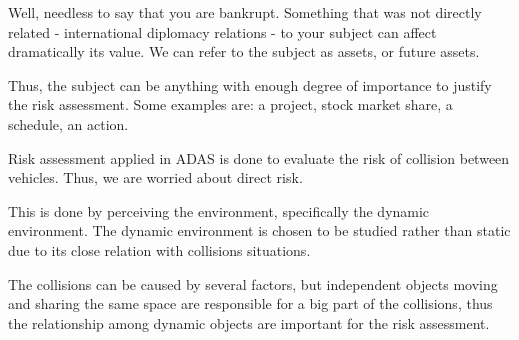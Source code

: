 Well, needless to say that you are bankrupt. Something that was not directly related - international diplomacy relations - to your subject can affect dramatically its value. We can refer to the subject as assets, or future assets.

Thus, the subject can be anything with enough degree of importance to justify the risk assessment. Some examples are: a project, stock market share, a schedule, an action.

Risk assessment applied in ADAS is done to evaluate the risk of collision between vehicles. Thus, we are worried about direct risk. 

This is done by perceiving the environment, specifically the dynamic environment. The dynamic environment is chosen to be studied rather than static due to its close relation with  collisions situations. 

The collisions can be caused by several factors, but independent objects moving and sharing the same space are responsible for a big part of the collisions, thus the relationship among dynamic objects are important for the risk assessment.
